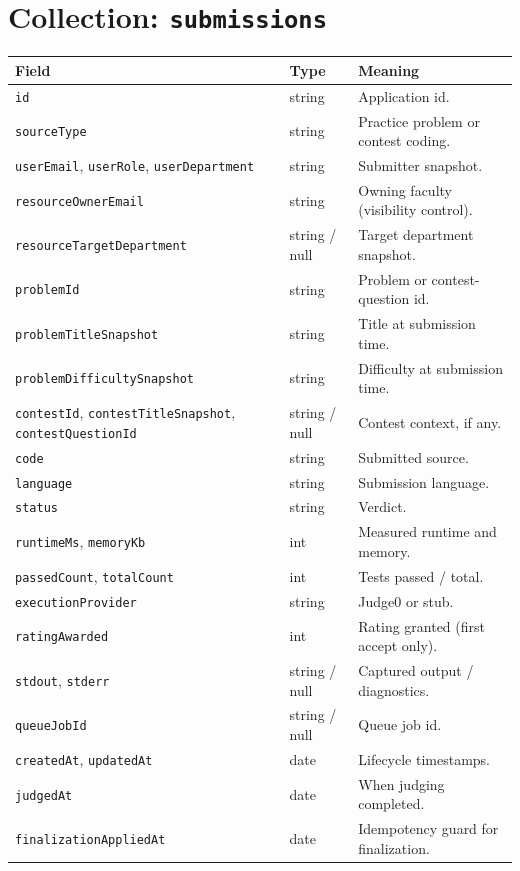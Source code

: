 \documentclass[12pt,a4paper,oneside]{report}
\newcommand{\code}[1]{\texttt{#1}}
\begin{document}
\section{Collection: \code{submissions}}
\begin{xltabular}{\linewidth}{@{}l l X@{}}
\toprule
\textbf{Field} & \textbf{Type} & \textbf{Meaning}\\
\midrule
\endhead
\code{id} & string & Application id.\\
\code{sourceType} & string & Practice problem or contest coding.\\
\code{userEmail}, \code{userRole}, \code{userDepartment} & string & Submitter snapshot.\\
\code{resourceOwnerEmail} & string & Owning faculty (visibility control).\\
\code{resourceTargetDepartment} & string / null & Target department snapshot.\\
\code{problemId} & string & Problem or contest-question id.\\
\code{problemTitleSnapshot} & string & Title at submission time.\\
\code{problemDifficultySnapshot} & string & Difficulty at submission time.\\
\code{contestId}, \code{contestTitleSnapshot}, \code{contestQuestionId} & string / null & Contest context, if any.\\
\code{code} & string & Submitted source.\\
\code{language} & string & Submission language.\\
\code{status} & string & Verdict.\\
\code{runtimeMs}, \code{memoryKb} & int & Measured runtime and memory.\\
\code{passedCount}, \code{totalCount} & int & Tests passed / total.\\
\code{executionProvider} & string & Judge0 or stub.\\
\code{ratingAwarded} & int & Rating granted (first accept only).\\
\code{stdout}, \code{stderr} & string / null & Captured output / diagnostics.\\
\code{queueJobId} & string / null & Queue job id.\\
\code{createdAt}, \code{updatedAt} & date & Lifecycle timestamps.\\
\code{judgedAt} & date & When judging completed.\\
\code{finalizationAppliedAt} & date & Idempotency guard for finalization.\\
\bottomrule
\end{xltabular}
\end{document}
